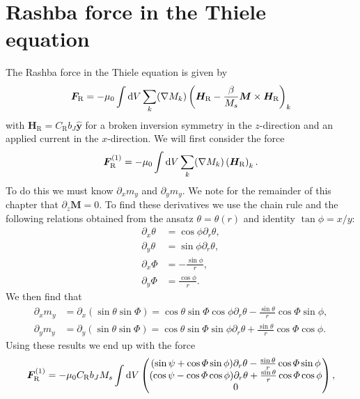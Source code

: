 \chapter{Rashba force in the Thiele equation}\label{app:F_RashbaThiele}
The Rashba force in the Thiele equation is given by
\begin{align}
    \mathbold{F}_{\text{R}} = -\mu_0\int\d V\sum_k(\mathbold{\nabla}M_k)\left(\mathbold{H}_{\text{R}}-\frac{\beta}{M_s}\mathbold{M}\times\mathbold{H}_{\text{R}}\right)_k
\end{align}
with $\mathbold{H}_{\text{R}} = C_{\text{R}} b_J\mathbold{\hat{y}}$ for a broken inversion symmetry in the $z$-direction and an applied current in the $x$-direction. We will first consider the force 
\begin{align}
    \mathbold{F}_{\text{R}}^{(1)} = -\mu_0\int\d V\sum_k(\mathbold{\nabla}M_k)\left(\mathbold{H}_{\text{R}}\right)_k.
\end{align}
To do this we must know $\partial_x m_y$ and $\partial_y m_y$. We note for the remainder of this chapter that $\partial_z \mathbold{M} = 0$. To find these derivatives we use the chain rule and the following relations obtained from the ansatz $\theta = \theta(r)$ and identity $\tan\phi=x/y$:
\begin{subequations}
\begin{align}
    \partial_x\theta &= \cos\phi \partial_r \theta, \\
    \partial_y\theta &= \sin\phi\partial_r\theta, \\
    \partial_x\Phi &= -\frac{\sin\phi}{r}, \\
    \partial_y\Phi &= \frac{\cos\phi}{r}.
\end{align}
\end{subequations}
We then find that
\begin{subequations}
\begin{align}
    \partial_x m_y &= \partial_x(\sin\theta\sin\Phi) = \cos\theta\sin\Phi\cos\phi\partial_r\theta - \frac{\sin\theta}{r}\cos\Phi\sin\phi, \\
    \partial_y m_y &= \partial_y(\sin\theta\sin\Phi) = \cos\theta\sin\Phi\sin\phi\partial_r\theta + \frac{\sin\theta}{r}\cos\Phi\cos\phi.
\end{align}
\end{subequations}
Using these results we end up with the force
\begin{align}
    \mathbold{F}_{\text{R}}^{(1)} = -\mu_0C_{\text{R}}b_J M_s\int\d V
    \begin{pmatrix}
    (\sin\psi+\cos\Phi\sin\phi)\partial_r\theta-\frac{\sin\theta}{r}\cos\Phi\sin\phi \\
    (\cos\psi-\cos\Phi\cos\phi)\partial_r\theta+\frac{\sin\theta}{r}\cos\Phi\cos\phi \\
    0
    \end{pmatrix},
\end{align}
